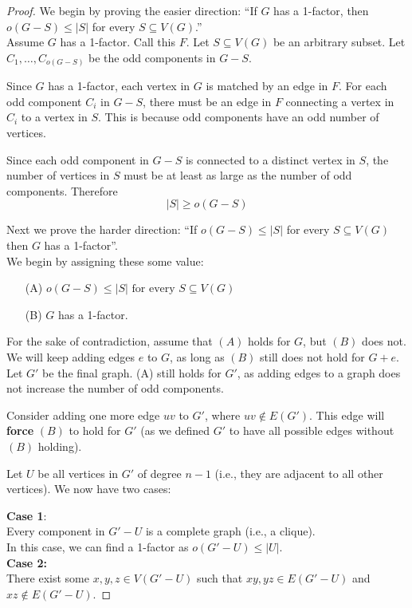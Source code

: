 \begin{proof}
	We begin by proving the easier direction:
	``If $G$ has a 1-factor, then $o(G-S) \le |S|$ for every $S \subseteq V(G)$.''\\
	\noindent
	Assume $G$ has a 1-factor. Call this $F$. Let $S \subseteq V(G)$ be an arbitrary subset. Let $C_{1}, \ldots, C_{o(G-S)}$ be the odd components in $G-S$.

	Since $G$ has a 1-factor, each vertex in $G$ is matched by an edge in $F$. For each odd component $C_{i}$ in $G-S$, there must be an edge in $F$ connecting a vertex in $C_{i}$ to a vertex in $S$. This is because odd components have an odd number of vertices.

	Since each odd component in $G-S$ is connected to a distinct vertex in $S$, the number of vertices in $S$ must be at least as large as the number of odd components. Therefore
	\begin{equation*}
		|S| \ge o(G-S)
	\end{equation*}

	Next we prove the harder direction: ``If $o(G-S) \le |S|$ for every $S \subseteq V(G)$ then $G$ has a 1-factor''.\\
	\noindent
	We begin by assigning these some value:
	\begin{enumerate}
		\item[(A)] $o(G-S) \le |S| \text{ for every } S \subseteq V(G)$
		\item[(B)] $G$ has a 1-factor.
	\end{enumerate}

	For the sake of contradiction, assume that $(A)$ holds for $G$, but $(B)$ does not. We will keep adding edges $e$ to $G$, as long as $(B)$ still does not hold for $G+e$. Let $G'$ be the final graph. (A) still holds for $G'$, as adding edges to a graph does not increase the number of odd components.

	Consider adding one more edge $uv$ to $G'$, where $uv \notin E(G')$. This edge will \textbf{force} $(B)$ to hold for $G'$ (as we defined $G'$ to have all possible edges without $(B)$ holding).

	Let $U$ be all vertices in $G'$ of degree $n-1$ (i.e., they are adjacent to all other vertices). We now have two cases:

	\textbf{Case 1}:\\
	\noindent
	Every component in $G'-U$ is a complete graph (i.e., a clique).\\
	In this case, we can find a 1-factor as $o(G'-U) \le |U|$. \\
	\noindent
	\textbf{Case 2:}\\
	\noindent
	There exist some $x,y,z \in V(G'-U)$ such that $xy,yz \in E(G'-U)$ and $xz \notin E(G'-U)$.
\end{proof}


